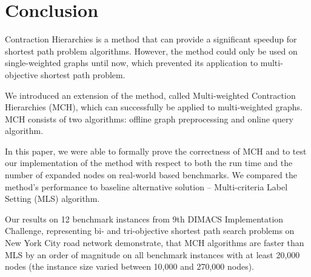 

\section{Conclusion}
\label{secConclusion}

Contraction Hierarchies is a method that can provide a significant speedup for 
shortest path problem algorithms. However, the method could only be used on 
single-weighted graphs until now, which prevented its application to multi-objective
shortest path problem. 

We introduced an extension of the method, called Multi-weighted Contraction Hierarchies (MCH),
which can successfully be applied to multi-weighted graphs. 
MCH consists of two algorithms: offline graph preprocessing and online query algorithm. 

In this paper, we were able to formally prove the correctness of MCH and to test our 
implementation of the method with respect to both the run time and the number of expanded nodes 
on real-world based benchmarks. We compared the method's performance to baseline alternative 
solution -- Multi-criteria Label Setting (MLS) algorithm.

Our results on 12 benchmark instances from 9th DIMACS Implementation Challenge,
representing bi- and tri-objective shortest path search problems on New York City 
road network demonstrate, that MCH algorithms are faster than MLS by an order of 
magnitude on all benchmark instances with at least 20,000 nodes (the instance size 
varied between 10,000 and 270,000 nodes). 


